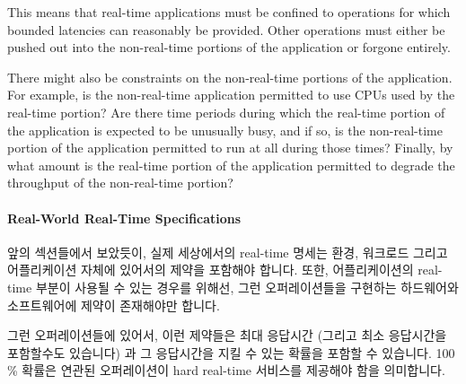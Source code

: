 This means that real-time applications must be confined to operations
for which bounded latencies can reasonably be provided.
Other operations must either be pushed out into the non-real-time portions
of the application or forgone entirely.

There might also be constraints on the non-real-time portions of the
application.
For example, is the non-real-time application permitted to use CPUs used
by the real-time portion?
Are there time periods during which the real-time portion of the application
is expected to be unusually busy, and if so, is the non-real-time portion
of the application permitted to run at all during those times?
Finally, by what amount is the real-time portion of the application permitted
to degrade the throughput of the non-real-time portion?
\fi

\paragraph{Real-World Real-Time Specifications}
\label{sec:advsync:Real-World Real-Time Specifications}

앞의 섹션들에서 보았듯이, 실제 세상에서의 real-time 명세는 환경, 워크로드
그리고 어플리케이션 자체에 있어서의 제약을 포함해야 합니다.
또한, 어플리케이션의 real-time 부분이 사용될 수 있는 경우를 위해선, 그런
오퍼레이션들을 구현하는 하드웨어와 소프트웨어에 제약이 존재해야만 합니다.

그런 오퍼레이션들에 있어서, 이런 제약들은 최대 응답시간 (그리고 최소 응답시간을
포함할수도 있습니다) 과 그 응답시간을 지킬 수 있는 확률을 포함할 수 있습니다.
100\,\% 확률은 연관된 오퍼레이션이 hard real-time 서비스를 제공해야 함을
의미합니다.

